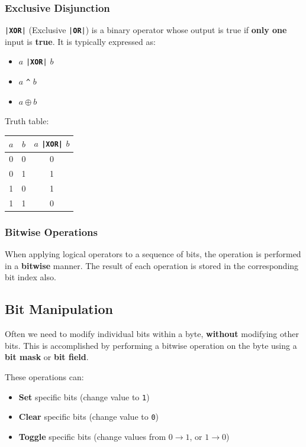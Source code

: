 \documentclass{article}
\newcommand{\keyword}[1]{\textcolor[rgb]{0.00,0.50,0.00}{\textbf{#1}}}
\begin{document}
\subsubsection{Exclusive Disjunction}
\texttt{|\keyword{XOR}|} (Exclusive \texttt{|\keyword{OR}|}) is a binary operator whose output is true if \textbf{only one} input is \textbf{true}.
It is typically expressed as:
\begin{itemize}
    \item \(a\) \texttt{|\keyword{XOR}|} \(b\)
    \item \(a\) \texttt{^} \(b\)
    \item \(a \oplus b\)
\end{itemize}
Truth table:
\begin{table}[H]
    \centering
    \begin{tabular}{c c c}
        \toprule
        \textbf{\(a\)} & \textbf{\(b\)} & \(a\) \texttt{|\keyword{XOR}|} \(b\) \\
        \midrule
        0              & 0              & 0                                              \\
        0              & 1              & 1                                              \\
        1              & 0              & 1                                              \\
        1              & 1              & 0                                              \\
        \bottomrule
    \end{tabular}
\end{table}
\subsubsection{Bitwise Operations}
When applying logical operators to a sequence of bits, the operation is performed in a \textbf{bitwise} manner. The result of each operation is stored in the corresponding bit index also.
\subsection{Bit Manipulation}
Often we need to modify individual bits within a byte, \textbf{without} modifying other bits.
This is accomplished by performing a bitwise operation on the byte using a \textbf{bit mask} or \textbf{bit field}.

These operations can:
\begin{itemize}
    \item \textbf{Set} specific bits (change value to \texttt{1})
    \item \textbf{Clear} specific bits (change value to \texttt{0})
    \item \textbf{Toggle} specific bits (change values from \(0 \to 1\), or \(1 \to 0\))
\end{itemize}
\end{document}

